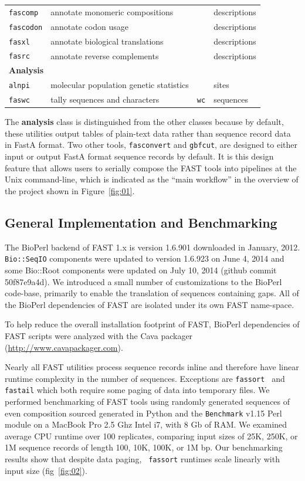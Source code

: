 \documentclass{frontiersSCNS} %
\begin{document}
\begin{table}[!t]
{\begin{tabular}{llll}
    {\tt fascomp} & annotate monomeric compositions &  & descriptions \\
    {\tt fascodon} & annotate codon usage &  & descriptions \\
    {\tt fasxl} & annotate biological translations &  & descriptions \\
    {\tt fasrc} & annotate reverse complements &  & descriptions \\
\hline
  \multicolumn{4}{l}{{\bf Analysis}} \\
  \hline   
    {\tt alnpi} & molecular population genetic statistics &  &  sites \\
    {\tt faswc} & tally sequences and characters & {\tt wc} &   sequences \\
  \hline   
\end{tabular}}{}
\end{table}

The {\bf analysis} class is distinguished from the other classes
because by default, these utilities output tables of plain-text data
rather than sequence record data in FastA format. Two other tools,
{\tt fasconvert} and {\tt gbfcut}, are designed to either input or
output FastA format sequence records by default. It is this design
feature that allows users to serially compose the FAST tools into
pipelines at the Unix command-line, which is indicated as the ``main
workflow'' in the overview of the project shown in
Figure~\ref{fig:01}.

\subsection{General Implementation and Benchmarking}

The BioPerl backend of FAST 1.x is version 1.6.901 downloaded in
January, 2012. {\tt Bio::SeqIO} components were updated to version 1.6.923
on June 4, 2014 and some Bio::Root components were updated on July 10,
2014 (github commit 50f87e9a4d).  We introduced a small number of
customizations to the BioPerl code-base, primarily to
enable the translation of sequences containing gaps. All of the
BioPerl dependencies of FAST are isolated under its own FAST
name-space.

To help reduce the overall installation footprint of FAST, BioPerl
dependencies of FAST scripts were analyzed with the Cava packager
(\url{http://www.cavapackager.com}).

Nearly all FAST utilities process sequence records inline and
therefore have linear runtime complexity in the number of
sequences. Exceptions are {\tt fassort } and {\tt fastail} which both
require some paging of data into temporary files. We performed
benchmarking of FAST tools using randomly generated sequences of even
composition sourced generated in Python and the {\tt Benchmark} v1.15
Perl module on a MacBook Pro 2.5 Ghz Intel i7, with 8 Gb of RAM. We
examined average CPU runtime over 100 replicates, comparing input
sizes of 25K, 250K, or 1M sequence records of length 100, 10K, 100K,
or 1M bp. Our benchmarking results show that despite data paging, {\tt
  fassort} runtimes scale linearly with input size (fig~\ref{fig:02}).
\end{document}
